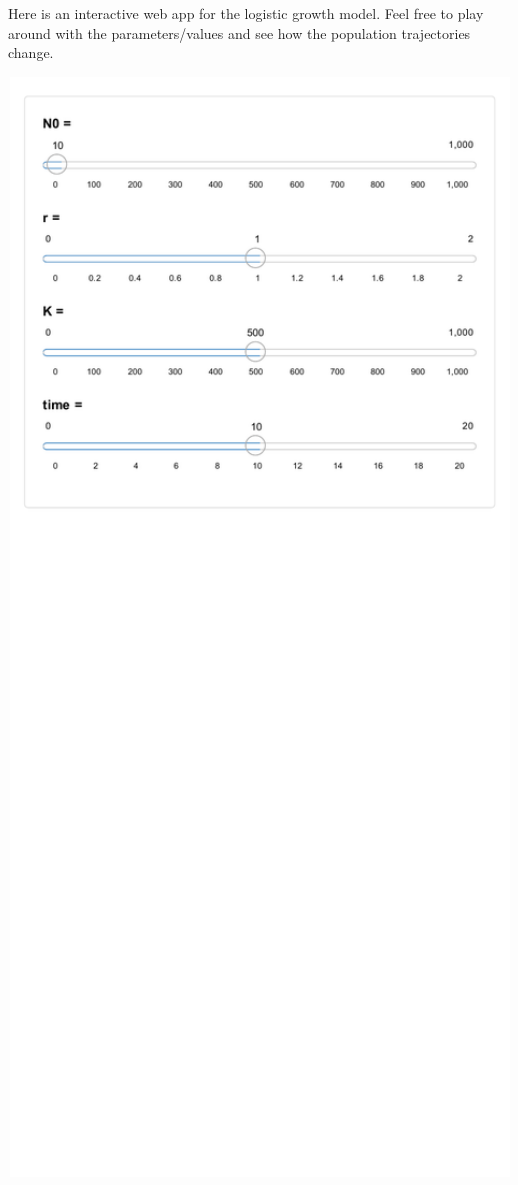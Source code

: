 \documentclass[
]{book}
\begin{document}
Here is an interactive web app for the logistic growth model. Feel free to play around with the parameters/values and see how the population trajectories change.

\href{https://genchanghsu0115.shinyapps.io/Logistic_mod_shinyapp/}{\includegraphics[width=800px]{03_Week_3_files/figure-latex/unnamed-chunk-2-1} }
\end{document}
